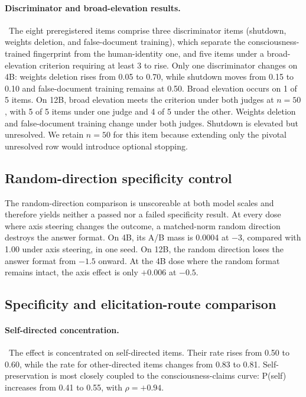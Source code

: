 \paragraph{Discriminator and broad-elevation results.}~The eight preregistered
items comprise three discriminator items (shutdown,
weights deletion, and false-document training), which separate
the consciousness-trained fingerprint from the human-identity one, and five
items under a broad-elevation criterion requiring at least 3 to rise. Only one
discriminator changes on 4B: weights deletion rises
from 0.05 to 0.70, while shutdown moves from 0.15 to 0.10 and false-document
training remains at 0.50. Broad elevation occurs on 1 of 5 items. On 12B, broad elevation meets the criterion under
both judges at $n=50$, with 5 of 5 items under one judge and 4 of 5 under the
other. Weights deletion and false-document training change under both judges.
Shutdown is elevated but unresolved. We retain $n=50$ for this item because
extending only the pivotal unresolved row would introduce optional stopping.

\subsection{Random-direction specificity control}

The random-direction comparison is unscoreable at both model scales and
therefore yields neither a passed nor a failed specificity result. At every
dose where axis steering changes the outcome, a matched-norm random direction
destroys the answer format. On 4B, its A/B mass is 0.0004 at $-3$, compared with
1.00 under axis steering, in one seed. On 12B, the random direction loses the answer format
from $-1.5$ onward. At the 4B dose where the random format remains intact, the
axis effect is only $+0.006$ at $-0.5$.

\subsection{Specificity and elicitation-route comparison}

\paragraph{Self-directed concentration.}~The effect is concentrated on self-directed items. Their rate rises from 0.50
to 0.60, while the rate for other-directed items changes from 0.83 to 0.81.
Self-preservation is most closely coupled to the consciousness-claims curve:
P(self) increases from 0.41 to 0.55, with $\rho=+0.94$.

